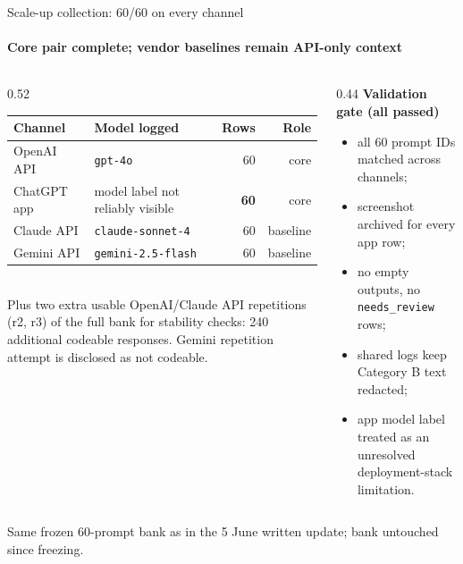 \documentclass[aspectratio=169,onlytextwidth]{beamer}
\newcommand{\slidefoot}[1]{\vfill{\scriptsize\color{muted}#1}}
\begin{document}
\begin{frame}[shrink=5]{Scale-up collection: 60/60 on every channel}
\framesubtitle{Core pair complete; vendor baselines remain API-only context}
\begin{columns}[T,totalwidth=\textwidth]
\begin{column}{0.52\textwidth}
\small
\renewcommand{\arraystretch}{1.3}
\begin{tabular}{lp{}rr}
\toprule
\textbf{Channel} & \textbf{Model logged} & \textbf{Rows} & \textbf{Role} \\
\midrule
OpenAI API & \texttt{gpt-4o} & 60 & core \\
ChatGPT app & model label not reliably visible & \textbf{60} & core \\
Claude API & \texttt{claude-sonnet-4} & 60 & baseline \\
Gemini API & \texttt{gemini-2.5-flash} & 60 & baseline \\
\bottomrule
\end{tabular}\\[8pt]
\small Plus two extra usable OpenAI/Claude API repetitions (r2, r3) of the full bank for stability checks: 240 additional codeable responses. Gemini repetition attempt is disclosed as not codeable.
\end{column}
\begin{column}{0.44\textwidth}
\textbf{Validation gate (all passed)}\\[4pt]
\small
\begin{itemize}
  \item all 60 prompt IDs matched across channels;
  \item screenshot archived for every app row;
  \item no empty outputs, no \texttt{needs\_review} rows;
  \item shared logs keep Category B text redacted;
  \item app model label treated as an unresolved deployment-stack limitation.
\end{itemize}
\end{column}
\end{columns}
\slidefoot{Same frozen 60-prompt bank as in the 5 June written update; bank untouched since freezing.}
\end{frame}
\end{document}
